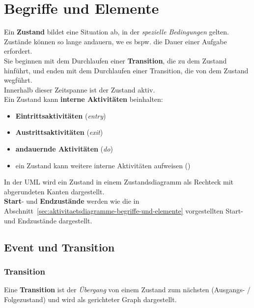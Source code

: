 \section{Begriffe und Elemente}

Ein \textbf{Zustand} bildet eine Situation ab, in der \textit{spezielle Bedingungen} gelten.\\

\noindent
Zustände können so lange andauern, we es bspw. die Dauer einer Aufgabe erfordert.\\

\noindent
Sie beginnen mit dem Durchlaufen einer \textbf{Transition}, die zu dem Zustand hinführt, und enden mit dem Durchlaufen einer Transition, die von dem Zustand wegführt.\\
Innerhalb dieser Zeitspanne ist der Zustand aktiv.\\

\noindent
Ein Zustand kann \textbf{interne Aktivitäten} beinhalten:

\begin{itemize}
    \item \textbf{Eintrittsaktivitäten} (\textit{entry})
    \item \textbf{Austrittsaktivitäten} (\textit{exit})
    \item \textbf{andauernde Aktivitäten} (\textit{do})
    \item ein Zustand kann weitere interne Aktivitäten aufweisen (\cite[69]{Buh09})
\end{itemize}

\noindent
In der UML wird ein Zustand in einem Zustandsdiagramm als Rechteck mit abgerundeten Kanten dargestellt.\\

\noindent
\textbf{Start}- und \textbf{Endzustände} werden wie die in Abschnitt~\ref{sec:aktivitaetsdiagramme-begriffe-und-elemente} vorgestellten Start- und Endzustände dargestellt.


\subsection{Event und Transition}

\subsubsection*{Transition}
Eine \textbf{Transition} ist der \textit{Übergang} von einem Zustand zum nächsten (Ausgangs- / Folgezustand) und wird als gerichteter Graph dargestellt.\\

